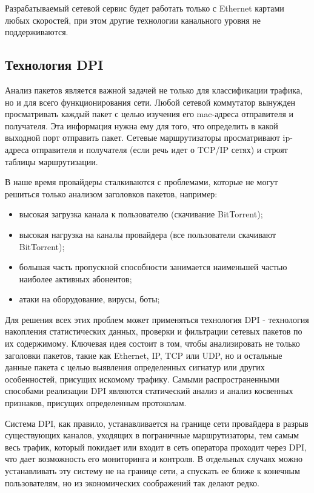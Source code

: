 Разрабатываемый сетевой сервис будет работать только с Ethernet картами любых скоростей, при этом другие технологии канального уровня не поддерживаются.

\subsection{Технология DPI}
Анализ пакетов является важной задачей не только для классификации трафика, но и для всего функционирования сети. Любой сетевой коммутатор вынужден просматривать каждый пакет с целью изучения его mac-адреса отправителя и получателя. Эта информация нужна ему для того, что определить в какой выходной порт отправить пакет. Сетевые маршрутизаторы просматривают ip-адреса отправителя и получателя (если речь идет о TCP/IP сетях) и строят таблицы маршрутизации.

В наше время провайдеры сталкиваются с проблемами, которые не могут решиться только анализом заголовков пакетов, например:
\begin{itemize}
\item высокая загрузка канала к пользователю (скачивание BitTorrent);
\item высокая нагрузка на каналы провайдера (все пользователи скачивают BitTorrent);
\item большая часть пропускной способности занимается наименьшей частью наиболее активных абонентов;
\item атаки на оборудование, вирусы, боты;
\end{itemize}

Для решения всех этих проблем может применяться технология DPI - технология накопления статистических данных, проверки и фильтрации сетевых пакетов по их содержимому. Ключевая идея состоит в том, чтобы анализировать не только заголовки пакетов, такие как Ethernet, IP, TCP или UDP, но и остальные данные пакета с целью выявления определенных сигнатур или других особенностей, присущих искомому трафику. Самыми распространенными способами реализации DPI являются статический анализ и анализ косвенных признаков, присущих определенным протоколам. 

Система DPI, как правило, устанавливается на границе сети провайдера в разрыв существующих каналов, уходящих в пограничные маршрутизаторы, тем самым весь трафик, который покидает или входит в сеть оператора проходит через DPI, что дает возможность его мониторинга и контроля. В отдельных случаях можно устанавливать эту систему не на границе сети, а спускать ее ближе к конечным пользователям, но из экономических соображений так делают редко.


